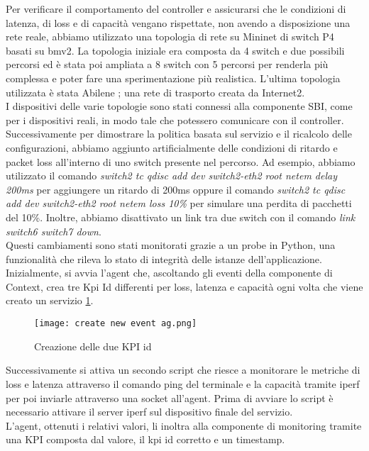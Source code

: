 Per verificare il comportamento del controller e assicurarsi che le condizioni di latenza, di loss e di capacità vengano rispettate, 
non avendo a disposizione una rete reale, abbiamo utilizzato una topologia di rete su Mininet di switch P4 basati su bmv2\cite{bmv2}.
La topologia iniziale era composta da 4 switch e due possibili percorsi ed è stata poi ampliata a 8 switch con 5 percorsi per renderla più complessa e poter fare una sperimentazione più realistica.
L'ultima topologia utilizzata è stata Abilene \cite{abilene}; una rete di trasporto creata da Internet2.
\\I dispositivi delle varie topologie sono stati connessi alla componente SBI, come per i dispositivi reali, in modo tale che potessero comunicare con il controller.
Successivamente per dimostrare la politica basata sul servizio e il ricalcolo delle configurazioni, abbiamo aggiunto artificialmente delle condizioni di ritardo e packet loss all’interno di uno switch presente nel percorso. 
Ad esempio, abbiamo utilizzato il comando \textit{switch2 tc qdisc add dev switch2-eth2 root netem delay 200ms} per aggiungere un ritardo di 200ms oppure il comando \textit{switch2 tc qdisc add dev switch2-eth2 root netem loss 10\%}
 per simulare una perdita di pacchetti del 10\%. Inoltre, abbiamo disattivato un link tra due switch con il comando \textit{link switch6 switch7 down}.
\\Questi cambiamenti sono stati monitorati grazie a un probe in Python, una funzionalità che rileva lo stato di integrità delle istanze dell'applicazione.
Inizialmente, si avvia l'agent che, ascoltando gli eventi della componente di Context, crea tre Kpi Id differenti per loss, latenza e capacità ogni volta che viene creato un servizio \ref{fig:agent}.
\begin{figure}[h]
    \centering
   \texttt{[image: create new event ag.png]}
    \caption{Creazione delle due KPI id}
    \label{fig:agent}
\end{figure}
Successivamente si attiva un secondo script che riesce a monitorare le metriche di loss e latenza attraverso il comando ping del terminale e la capacità tramite iperf per poi inviarle attraverso una socket all'agent.
Prima di avviare lo script è necessario attivare il server iperf sul dispositivo finale del servizio.
\\L'agent, ottenuti i relativi valori, li inoltra alla componente di monitoring tramite una KPI composta dal valore, il kpi id corretto e un timestamp.
